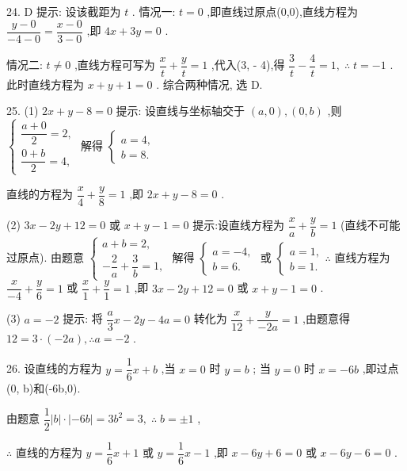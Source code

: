 24. D 提示: 设该截距为 $t$ . 情况一: $t = 0$ ,即直线过原点(0,0),直线方程为 $\dfrac{y - 0}{-4 - 0} = \dfrac{x - 0}{3 - 0}$ ,即 ${4x} + {3y} = 0$ .

情况二: $t \neq  0$ ,直线方程可写为 $\dfrac{x}{t} + \dfrac{y}{t} = 1$ ,代入(3, - 4),得 $\dfrac{3}{t} - \dfrac{4}{t} = 1,\;\therefore \;t =  - 1$ . 此时直线方程为 $x + y + 1 = 0$ . 综合两种情况, 选 D.

25. (1) ${2x} + y - 8 = 0$ 提示: 设直线与坐标轴交于 $\left( {a,0}\right) ,\left( {0,b}\right)$ ,则 $\left\{  \begin{array}{l} \dfrac{a + 0}{2} = 2, \\  \dfrac{0 + b}{2} = 4, \end{array}\right.$ 解得 $\left\{  \begin{array}{l} a = 4, \\  b = 8. \end{array}\right.$

直线的方程为 $\dfrac{x}{4} + \dfrac{y}{8} = 1$ ,即 ${2x} + y - 8 = 0$ .

(2) ${3x} - {2y} + {12} = 0$ 或 $x + y - 1 = 0$ 提示:设直线方程为 $\dfrac{x}{a} + \dfrac{y}{b} = 1$ (直线不可能过原点). 由题意 $\left\{  \begin{array}{l} a + b = 2, \\   - \dfrac{2}{a} + \dfrac{3}{b} = 1, \end{array}\right.$ 解得 $\left\{  \begin{array}{l} a =  - 4, \\  b = 6. \end{array}\right.$ 或 $\left\{  {\begin{array}{l} a = 1, \\  b = 1. \end{array}\therefore }\right.$ 直线方程为 $\dfrac{x}{-4} + \dfrac{y}{6} = 1$ 或 $\dfrac{x}{1} + \dfrac{y}{1} = 1$ ,即 ${3x} - {2y} + {12} = 0$ 或 $x + y - 1 = 0$ .

(3) $a =  - 2$ 提示: 将 $\dfrac{a}{3}x - {2y} - {4a} = 0$ 转化为 $\dfrac{x}{12} + \dfrac{y}{-{2a}} = 1$ ,由题意得 ${12} = 3 \cdot  \left( {-{2a}}\right) ,\therefore a =  - 2$ .

26. 设直线的方程为 $y = \dfrac{1}{6}x + b$ ,当 $x = 0$ 时 $y = b$ ; 当 $y = 0$ 时 $x =  - {6b}$ ,即过点(0, b)和(-6b,0).

由题意 $\dfrac{1}{2}\left| b\right|  \cdot  \left| {-{6b}}\right|  = 3{b}^{2} = 3,\;\therefore \;b =  \pm  1$ ,

$\therefore$ 直线的方程为 $y = \dfrac{1}{6}x + 1$ 或 $y = \dfrac{1}{6}x - 1$ ,即 $x - {6y} + 6 = 0$ 或 $x - {6y} - 6 = 0$ .

